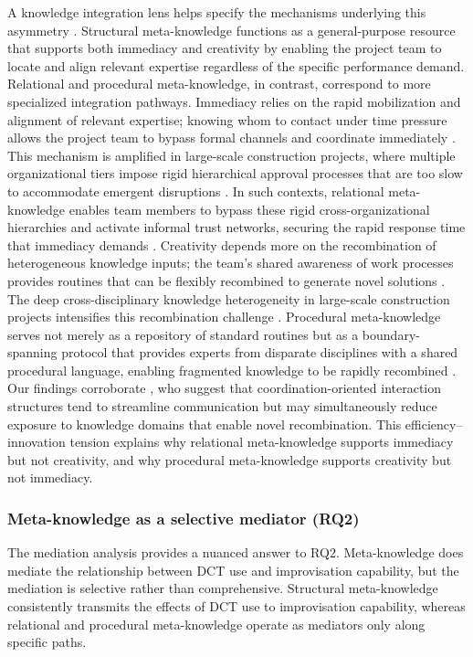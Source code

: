 \documentclass[authoryear,preprint,review,times,10pt]{elsarticle}
\begin{document}
A knowledge integration lens helps specify the mechanisms underlying this asymmetry \citep{perry-smith2017Creativity}. Structural meta-knowledge functions as a general-purpose resource that supports both immediacy and creativity by enabling the project team to locate and align relevant expertise regardless of the specific performance demand. Relational and procedural meta-knowledge, in contrast, correspond to more specialized integration pathways. Immediacy relies on the rapid mobilization and alignment of relevant expertise; knowing whom to contact under time pressure allows the project team to bypass formal channels and coordinate immediately \citep{okhuysen200910}. This mechanism is amplified in large-scale construction projects, where multiple organizational tiers impose rigid hierarchical approval processes that are too slow to accommodate emergent disruptions \citep{shen2022Largescale}. In such contexts, relational meta-knowledge enables team members to bypass these rigid cross-organizational hierarchies and activate informal trust networks, securing the rapid response time that immediacy demands \citep{jiang2025Confronting}. Creativity depends more on the recombination of heterogeneous knowledge inputs; the team's shared awareness of work processes provides routines that can be flexibly recombined to generate novel solutions \citep{perry-smith2017Creativity}. The deep cross-disciplinary knowledge heterogeneity in large-scale construction projects intensifies this recombination challenge \citep{yang2025How}. Procedural meta-knowledge serves not merely as a repository of standard routines but as a boundary-spanning protocol that provides experts from disparate disciplines with a shared procedural language, enabling fragmented knowledge to be rapidly recombined \citep{xie2025How}. Our findings corroborate \citet{soda2019Network}, who suggest that coordination-oriented interaction structures tend to streamline communication but may simultaneously reduce exposure to knowledge domains that enable novel recombination. This efficiency--innovation tension explains why relational meta-knowledge supports immediacy but not creativity, and why procedural meta-knowledge supports creativity but not immediacy.

\subsubsection{Meta-knowledge as a selective mediator (RQ2)}
The mediation analysis provides a nuanced answer to RQ2. Meta-knowledge does mediate the relationship between DCT use and improvisation capability, but the mediation is selective rather than comprehensive. Structural meta-knowledge consistently transmits the effects of DCT use to improvisation capability, whereas relational and procedural meta-knowledge operate as mediators only along specific paths.
\end{document}
